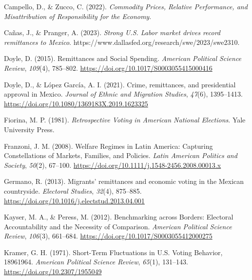 \documentclass[
]{article}
\newlength{\cslhangindent}
\newlength{\cslentryspacingunit} %
\newenvironment{CSLReferences}[2] %
 {%
  \setlength{\parindent}{0pt}
  \ifodd #1
  \let\oldpar\par
  \def\par{\hangindent=\cslhangindent\oldpar}
  \fi
  \setlength{\parskip}{#2\cslentryspacingunit}
 }%
 {}
\begin{document}
\begin{CSLReferences}{1}{0}
\leavevmode{}%
Campello, D., \& Zucco, C. (2022). \emph{Commodity {Prices}, {Relative
Performance}, and {Misattribution} of {Responsibility} for the
{Economy}}.

\leavevmode{}%
Cañas, J., \& Pranger, A. (2023). \emph{Strong {U}.{S}. Labor market
drives record remittances to {Mexico}}.
https://www.dallasfed.org/research/swe/2023/swe2310.

\leavevmode{}%
Doyle, D. (2015). Remittances and {Social Spending}. \emph{American
Political Science Review}, \emph{109}(4), 785--802.
\url{https://doi.org/10.1017/S0003055415000416}

\leavevmode{}%
Doyle, D., \& López García, A. I. (2021). Crime, remittances, and
presidential approval in {Mexico}. \emph{Journal of Ethnic and Migration
Studies}, \emph{47}(6), 1395--1413.
\url{https://doi.org/10.1080/1369183X.2019.1623325}

\leavevmode{}%
Fiorina, M. P. (1981). \emph{Retrospective {Voting} in {American
National Elections}}. {Yale University Press}.

\leavevmode{}%
Franzoni, J. M. (2008). Welfare {Regimes} in {Latin America}: {Capturing
Constellations} of {Markets}, {Families}, and {Policies}. \emph{Latin
American Politics and Society}, \emph{50}(2), 67--100.
\url{https://doi.org/10.1111/j.1548-2456.2008.00013.x}

\leavevmode{}%
Germano, R. (2013). Migrants' remittances and economic voting in the
{Mexican} countryside. \emph{Electoral Studies}, \emph{32}(4), 875--885.
\url{https://doi.org/10.1016/j.electstud.2013.04.001}

\leavevmode{}%
Kayser, M. A., \& Peress, M. (2012). Benchmarking across {Borders}:
{Electoral Accountability} and the {Necessity} of {Comparison}.
\emph{American Political Science Review}, \emph{106}(3), 661--684.
\url{https://doi.org/10.1017/S0003055412000275}

\leavevmode{}%
Kramer, G. H. (1971). Short-{Term Fluctuations} in {U}.{S}. {Voting
Behavior}, 1896{\textendash}1964. \emph{American Political Science
Review}, \emph{65}(1), 131--143. \url{https://doi.org/10.2307/1955049}


\end{CSLReferences}
\end{document}
